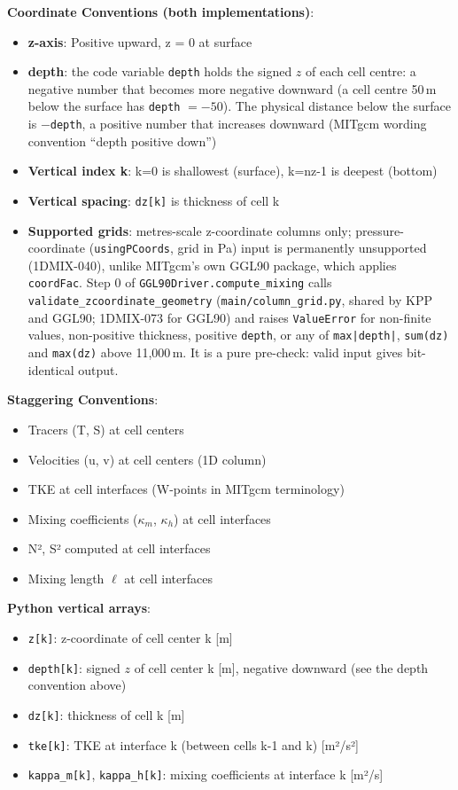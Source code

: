 \documentclass[11pt]{article}
\begin{document}
\textbf{Coordinate Conventions (both implementations)}:
\begin{itemize}
    \item \textbf{z-axis}: Positive upward, z = 0 at surface
    \item \textbf{depth}: the code variable \verb|depth| holds the signed $z$ of each cell centre: a negative number that becomes more negative downward (a cell centre 50\,m below the surface has \verb|depth| $= -50$). The physical distance below the surface is $-$\verb|depth|, a positive number that increases downward (MITgcm wording convention ``depth positive down'')
    \item \textbf{Vertical index k}: k=0 is shallowest (surface), k=nz-1 is deepest (bottom)
    \item \textbf{Vertical spacing}: \verb|dz[k]| is thickness of cell k
    \item \textbf{Supported grids}: metres-scale z-coordinate columns only; pressure-coordinate (\verb|usingPCoords|, grid in Pa) input is permanently unsupported (1DMIX-040), unlike MITgcm's own GGL90 package, which applies \verb|coordFac|. Step 0 of \verb|GGL90Driver.compute_mixing| calls \verb|validate_zcoordinate_geometry| (\verb|main/column_grid.py|, shared by KPP and GGL90; 1DMIX-073 for GGL90) and raises \verb|ValueError| for non-finite values, non-positive thickness, positive \verb|depth|, or any of \verb+max|depth|+, \verb+sum(dz)+ and \verb+max(dz)+ above 11,000\,m. It is a pure pre-check: valid input gives bit-identical output.
\end{itemize}

\textbf{Staggering Conventions}:
\begin{itemize}
    \item Tracers (T, S) at cell centers
    \item Velocities (u, v) at cell centers (1D column)
    \item TKE at cell interfaces (W-points in MITgcm terminology)
    \item Mixing coefficients ($\kappa_m$, $\kappa_h$) at cell interfaces
    \item N², S² computed at cell interfaces
    \item Mixing length $\ell$ at cell interfaces
\end{itemize}

\textbf{Python vertical arrays}:
\begin{itemize}
    \item \verb|z[k]|: z-coordinate of cell center k [m]
    \item \verb|depth[k]|: signed $z$ of cell center k [m], negative downward (see the depth convention above)
    \item \verb|dz[k]|: thickness of cell k [m]
    \item \verb|tke[k]|: TKE at interface k (between cells k-1 and k) [m²/s²]
    \item \verb|kappa_m[k]|, \verb|kappa_h[k]|: mixing coefficients at interface k [m²/s]
\end{itemize}
\end{document}
